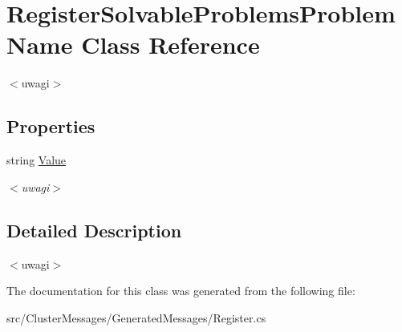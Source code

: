 \hypertarget{class_register_solvable_problems_problem_name}{}\section{Register\+Solvable\+Problems\+Problem\+Name Class Reference}
\label{class_register_solvable_problems_problem_name}


$<$uwagi$>$  


\subsection*{Properties}
\begin{DoxyCompactItemize}
\item 
\hypertarget{class_register_solvable_problems_problem_name_a41d3ac9d91292c1a5632b97ed336fb06}{}string \hyperlink{class_register_solvable_problems_problem_name_a41d3ac9d91292c1a5632b97ed336fb06}{Value}\label{class_register_solvable_problems_problem_name_a41d3ac9d91292c1a5632b97ed336fb06}

\begin{DoxyCompactList}\small\item\em $<$uwagi$>$ \end{DoxyCompactList}\end{DoxyCompactItemize}


\subsection{Detailed Description}
$<$uwagi$>$ 

The documentation for this class was generated from the following file\+:\begin{DoxyCompactItemize}
\item 
src/\+Cluster\+Messages/\+Generated\+Messages/Register.\+cs\end{DoxyCompactItemize}
